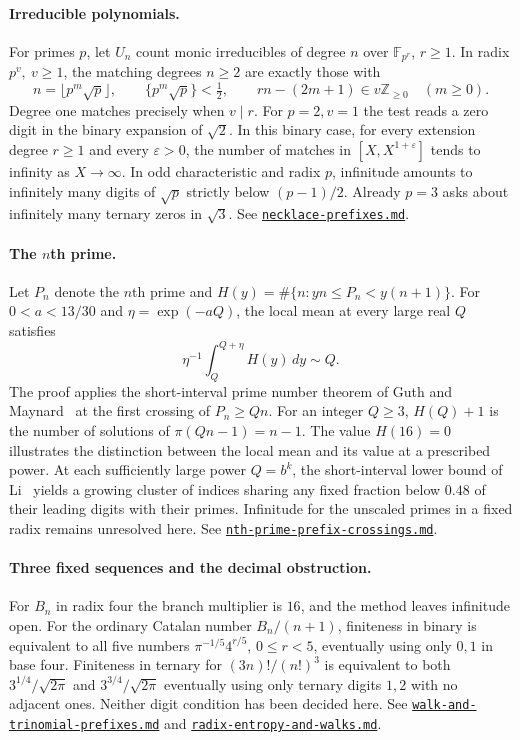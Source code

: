 \documentclass[11pt,reqno,a4paper]{amsart}
\theoremstyle{remark}
\newcommand{\companion}[1]{\href{../#1.md}{\nolinkurl{#1.md}}}
\begin{document}
\paragraph{Irreducible polynomials.}
For primes \(p\), let \(U_n\) count monic irreducibles of degree \(n\)
over \(\mathbb F_{p^r}\), \(r\ge1\). In radix \(p^v,\ v\ge1\), the
matching degrees \(n\ge2\) are exactly those with
\[
 n=\lfloor p^m\sqrt p\rfloor,\qquad
 \{p^m\sqrt p\}<\tfrac12,\qquad
 rn-(2m+1)\in v\mathbb Z_{\ge0}\quad(m\ge0).
\]
Degree one matches precisely when \(v\mid r\). For \(p=2,v=1\) the
test reads a zero digit in the binary expansion of \(\sqrt2\).
In this binary case, for every extension degree \(r\ge1\) and every
\(\varepsilon>0\), the number of matches in \([X,X^{1+\varepsilon}]\)
tends to infinity as \(X\to\infty\). In odd
characteristic and radix \(p\), infinitude amounts to infinitely many
digits of \(\sqrt p\) strictly below \((p-1)/2\). Already \(p=3\)
asks about infinitely many ternary zeros in \(\sqrt3\). See
\companion{necklace-prefixes}.

\paragraph{The \(n\)th prime.}
Let \(P_n\) denote the \(n\)th prime and
\(H(y)=\#\{n:yn\le P_n<y(n+1)\}\). For \(0<a<13/30\) and
\(\eta=\exp(-aQ)\), the local mean at every large real \(Q\) satisfies
\[
           \eta^{-1}\int_Q^{Q+\eta}H(y)\,dy\sim Q .
\]
The proof applies the short-interval prime number theorem of Guth and
Maynard~\cite{gm} at the first crossing of \(P_n\ge Qn\). For an
integer \(Q\ge3\), \(H(Q)+1\) is the number of solutions of
\(\pi(Qn-1)=n-1\). The value \(H(16)=0\) illustrates the distinction
between the local mean and its value at a prescribed power. At each sufficiently large power \(Q=b^k\), the short-interval lower bound of Li~\cite{li-primes} yields a growing cluster of indices sharing any fixed fraction below \(0.48\) of their leading digits with their primes. Infinitude
for the unscaled primes in a fixed radix remains unresolved here.
See \companion{nth-prime-prefix-crossings}.

\paragraph{Three fixed sequences and the decimal obstruction.}
For \(B_n\) in radix four the branch multiplier is \(16\), and the
method leaves infinitude open. For the ordinary Catalan number
\(B_n/(n+1)\), finiteness in binary is equivalent to all five numbers
\(\pi^{-1/5}4^{r/5}\), \(0\le r<5\), eventually using only \(0,1\)
in base four. Finiteness in ternary for \((3n)!/(n!)^3\) is equivalent
to both \(3^{1/4}/\sqrt{2\pi}\) and \(3^{3/4}/\sqrt{2\pi}\) eventually
using only ternary digits \(1,2\) with no adjacent ones. Neither
digit condition has been decided here. See
\companion{walk-and-trinomial-prefixes} and
\companion{radix-entropy-and-walks}.
\end{document}
